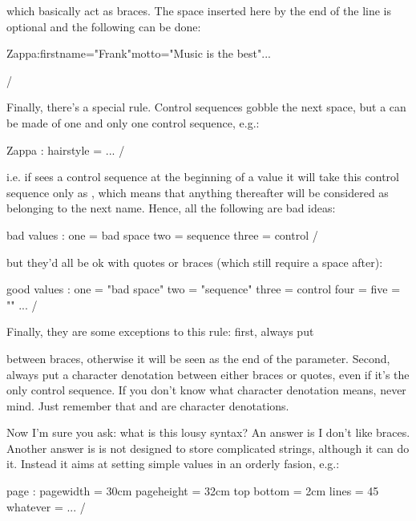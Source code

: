 \noindent which basically act as braces. The space inserted here by the
end of the line is optional and the following can be done:

\example
\setparameter Zappa:firstname="Frank"motto="Music is the best"...\par
\example/

\noindent Finally, there's a special rule. Control sequences gobble the
next space, but a \value can be made of one and only one control sequence,
e.g.:

\example
\setparameter Zappa :
  hairstyle  = \mustache
  ...
\example/

\noindent i.e. if \yax sees a control sequence at the beginning of a value
it will take this control sequence only as , which means that
anything thereafter will be considered as belonging to the next \param
name. Hence, all the following are bad ideas:

\example
\setparameter bad values :
  one   = bad space
  two   = \control sequence 
  three = control\sequence
\example/

\noindent but they'd all be ok with quotes or braces (which
still require a space after):

\example
\setparameter good values :
  one   = "bad space"
  two   = "\control sequence"
  three = {control\sequence}
  four  = \LonelyCommand
  five  = "\Command\Command"
...
\example/

\noindent Finally, they are some exceptions to this rule: first,
always put \com\par between braces, otherwise it will be seen
as the end of the parameter. Second, always put a character denotation
between either braces or quotes, even if it's the only control sequence.
If you don't know what character denotation means, never mind. Just remember
that \com\bgroup and \com\egroup are character denotations.

Now I'm sure you ask: what is this lousy syntax? An answer is I don't
like braces. Another answer is \yax is not designed to store complicated
strings, although it can do it. Instead it aims at setting simple values
in an orderly fasion, e.g.:

\example
\setparameter page :
  pagewidth    = 30cm
  pageheight   = 32cm
  top bottom   = 2cm
  lines        = 45
  whatever     = \foo
...
\example/

